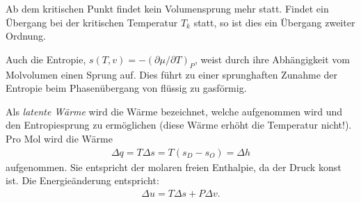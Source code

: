 \begin{summary}
Ab dem kritischen Punkt findet kein Volumensprung mehr statt. Findet ein Übergang bei der kritischen Temperatur $T_k$ statt, so ist dies ein Übergang zweiter Ordnung. 

Auch die Entropie, $s(T,v)=-\left(\partial \mu/\partial T\right)_P$, weist durch ihre Abhängigkeit vom Molvolumen einen Sprung auf. Dies führt zu einer sprunghaften Zunahme der Entropie beim Phasenübergang von flüssig zu gasförmig.

Als \emph{latente Wärme} wird die Wärme bezeichnet, welche aufgenommen wird und den Entropiesprung zu ermöglichen (diese Wärme erhöht die Temperatur nicht!). Pro Mol wird die Wärme
\begin{align*}
    \Delta q = T\Delta s = T(s_D-s_O) = \Delta h
\end{align*}
aufgenommen. Sie entspricht der molaren freien Enthalpie, da der Druck konst ist.
Die Energieänderung entspricht:
\begin{align*}
    \Delta u=T\Delta s+P\Delta v.
\end{align*}
\end{summary}
